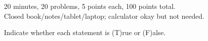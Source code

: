 \documentclass[12pt]{exam}
\begin{document}
\begin{flushleft}
    20 minutes, 20 problems, 5 points each, 100 points total. \\
    Closed book/notes/tablet/laptop; calculator okay but not needed.
\end{flushleft}

\begin{flushleft}
    Indicate whether each statement is (T)rue or (F)alse.
\end{flushleft}

\end{document}
